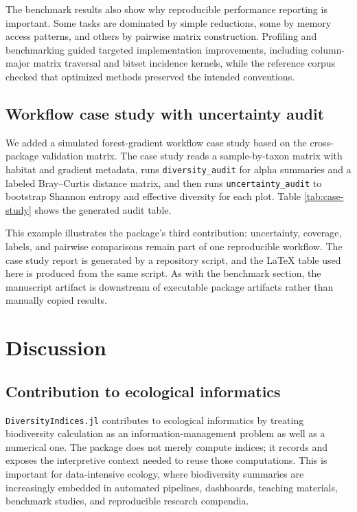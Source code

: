 \documentclass[preprint,12pt,authoryear]{elsarticle}
\begin{document}




The benchmark results also show why reproducible performance reporting is
important.  Some tasks are dominated by simple reductions, some by memory
access patterns, and others by pairwise matrix construction.  Profiling and
benchmarking guided targeted implementation improvements, including
column-major matrix traversal and bitset incidence kernels, while the
reference corpus checked that optimized methods preserved the intended
conventions.

\subsection{Workflow case study with uncertainty audit}

We added a simulated forest-gradient workflow case study based on the
cross-package validation matrix.  The case study reads a sample-by-taxon
matrix with habitat and gradient metadata, runs \texttt{diversity\_audit} for
alpha summaries and a labeled Bray--Curtis distance matrix, and then runs
\texttt{uncertainty\_audit} to bootstrap Shannon entropy and effective
diversity for each plot.  Table \ref{tab:case-study} shows the generated
audit table.



This example illustrates the package's third contribution: uncertainty,
coverage, labels, and pairwise comparisons remain part of one reproducible
workflow.  The case study report is generated by a repository script, and the
LaTeX table used here is produced from the same script.  As with the benchmark
section, the manuscript artifact is downstream of executable package
artifacts rather than manually copied results.

\section{Discussion}

\subsection{Contribution to ecological informatics}

\texttt{DiversityIndices.jl} contributes to ecological informatics by treating
biodiversity calculation as an information-management problem as well as a
numerical one.  The package does not merely compute indices; it records and
exposes the interpretive context needed to reuse those computations.  This is
important for data-intensive ecology, where biodiversity summaries are
increasingly embedded in automated pipelines, dashboards, teaching materials,
benchmark studies, and reproducible research compendia.
\end{document}
